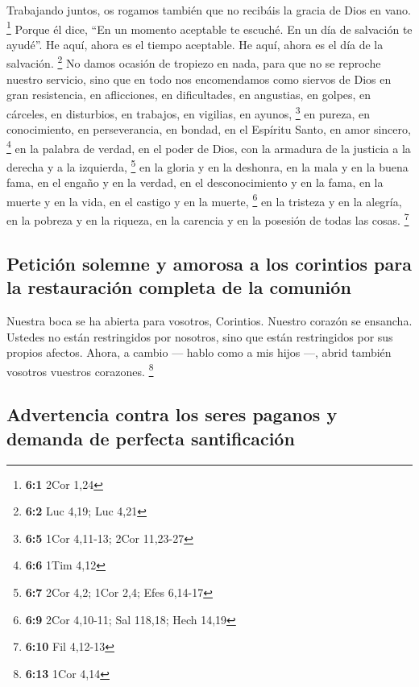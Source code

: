  Trabajando juntos, os rogamos también que no recibáis la
gracia de Dios en vano. \footnote{\textbf{6:1} 2Cor 1,24} 
Porque él dice, ``En un momento aceptable te escuché. En un día de
salvación te ayudé''. He aquí, ahora es el tiempo aceptable. He aquí,
ahora es el día de la salvación. \footnote{\textbf{6:2} Luc 4,19; Luc
  4,21}  No damos ocasión de tropiezo en nada, para que no
se reproche nuestro servicio,  sino que en todo nos
encomendamos como siervos de Dios en gran resistencia, en aflicciones,
en dificultades, en angustias,  en golpes, en cárceles, en
disturbios, en trabajos, en vigilias, en ayunos, \footnote{\textbf{6:5}
  1Cor 4,11-13; 2Cor 11,23-27}  en pureza, en
conocimiento, en perseverancia, en bondad, en el Espíritu Santo, en amor
sincero, \footnote{\textbf{6:6} 1Tim 4,12}  en la palabra
de verdad, en el poder de Dios, con la armadura de la justicia a la
derecha y a la izquierda, \footnote{\textbf{6:7} 2Cor 4,2; 1Cor 2,4;
  Efes 6,14-17}  en la gloria y en la deshonra, en la mala
y en la buena fama, en el engaño y en la verdad,  en el
desconocimiento y en la fama, en la muerte y en la vida, en el castigo y
en la muerte, \footnote{\textbf{6:9} 2Cor 4,10-11; Sal 118,18; Hech
  14,19}  en la tristeza y en la alegría, en la pobreza y
en la riqueza, en la carencia y en la posesión de todas las cosas.
\footnote{\textbf{6:10} Fil 4,12-13}

\hypertarget{peticiuxf3n-solemne-y-amorosa-a-los-corintios-para-la-restauraciuxf3n-completa-de-la-comuniuxf3n}{%
\subsection{Petición solemne y amorosa a los corintios para la
restauración completa de la
comunión}\label{peticiuxf3n-solemne-y-amorosa-a-los-corintios-para-la-restauraciuxf3n-completa-de-la-comuniuxf3n}}

 Nuestra boca se ha abierta para vosotros, Corintios.
Nuestro corazón se ensancha.  Ustedes no están
restringidos por nosotros, sino que están restringidos por sus propios
afectos.  Ahora, a cambio --- hablo como a mis hijos ---,
abrid también vosotros vuestros corazones. \footnote{\textbf{6:13} 1Cor
  4,14}

\hypertarget{advertencia-contra-los-seres-paganos-y-demanda-de-perfecta-santificaciuxf3n}{%
\subsection{Advertencia contra los seres paganos y demanda de perfecta
santificación}\label{advertencia-contra-los-seres-paganos-y-demanda-de-perfecta-santificaciuxf3n}}


